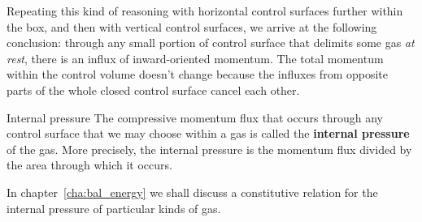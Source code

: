 \documentclass[a4paper,12pt,%
onecolumn,oneside,%
british%
]{memoir}
\renewcommand*{\|}[1][]{\nonscript\:#1\vert\nonscript\:\mathopen{}}
\newcommand*{\chap}{chapter}%
\begin{document}
Repeating this kind of reasoning with horizontal control surfaces further within the box, and then with vertical control surfaces, we arrive at the following conclusion: through any small portion of control surface that delimits some gas \emph{at rest}, there is an influx of inward-oriented momentum. The total momentum within the control volume doesn't change because the influxes from opposite parts of the whole closed control surface cancel each other.
%
\begin{definition}{Internal pressure}\label{def:internal_pressure}
  The compressive momentum flux that occurs through any control surface that we may choose within a gas is called the \textbf{internal pressure} of the gas. More precisely, the internal pressure is the momentum flux divided by the area through which it occurs.
\end{definition}
In \chap~\ref{cha:bal_energy} we shall discuss a constitutive relation for the internal pressure of particular kinds of gas.
\end{document}
